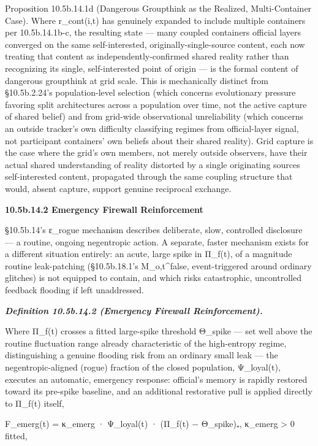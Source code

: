 \documentclass[
]{article}
\begin{document}
Proposition 10.5b.14.1d (Dangerous Groupthink as the Realized,
Multi-Container Case). Where r\_cont(i,t) has genuinely expanded to
include multiple containers per 10.5b.14.1b-c, the resulting state ---
many coupled containers official layers converged on the same
self-interested, originally-single-source content, each now treating
that content as independently-confirmed shared reality rather than
recognizing its single, self-interested point of origin --- is the
formal content of dangerous groupthink at grid scale. This is
mechanically distinct from §10.5b.2.24's population-level selection
(which concerns evolutionary pressure favoring split architectures
across a population over time, not the active capture of shared belief)
and from grid-wide observational unreliability (which concerns an
outside tracker's own difficulty classifying regimes from official-layer
signal, not participant containers' own beliefs about their shared
reality). Grid capture is the case where the grid's own members, not
merely outside observers, have their actual shared understanding of
reality distorted by a single originating sources self-interested
content, propagated through the same coupling structure that would,
absent capture, support genuine reciprocal exchange.

\textbf{10.5b.14.2 Emergency Firewall Reinforcement}

§10.5b.14's ε\_rogue mechanism describes deliberate, slow, controlled
disclosure --- a routine, ongoing negentropic action. A separate, faster
mechanism exists for a different situation entirely: an acute, large
spike in Π\_f(t), of a magnitude routine leak-patching (§10.5b.18.1's
M\_o,t\^{}false, event-triggered around ordinary glitches) is not
equipped to contain, and which risks catastrophic, uncontrolled feedback
flooding if left unaddressed.

\emph{\textbf{Definition 10.5b.14.2 (Emergency Firewall
Reinforcement).}}

Where Π\_f(t) crosses a fitted large-spike threshold Θ\_spike --- set
well above the routine fluctuation range already characteristic of the
high-entropy regime, distinguishing a genuine flooding risk from an
ordinary small leak --- the negentropic-aligned (rogue) fraction of the
closed population, Ψ\_loyal(t), executes an automatic, emergency
response: official's memory is rapidly restored toward its pre-spike
baseline, and an additional restorative pull is applied directly to
Π\_f(t) itself,

F\_emerg(t) = κ\_emerg · Ψ\_loyal(t) · (Π\_f(t) − Θ\_spike)₊, κ\_emerg
\textgreater{} 0 fitted,
\end{document}
